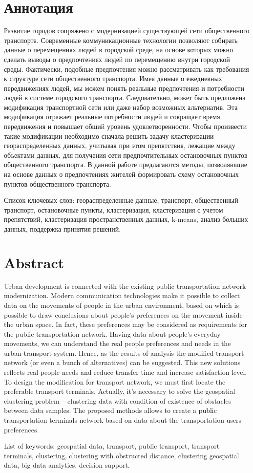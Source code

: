 \tocless\part{Аннотация}
Развитие городов сопряжено с модернизацией существующей сети общественного транспорта. Современные коммуникационные технологии позволяют собирать данные о перемещениях людей в городской среде, на основе которых можно сделать выводы о предпочтениях людей по перемещению внутри городской среды. Фактически, подобные предпочтения можно рассматривать как требования к структуре сети общественного транспорта. Имея данные о ежедневных передвижениях людей, мы можем понять реальные предпочтения и потребности людей в системе городского транспорта. Следовательно, может быть предложена модификация транспортной сети или даже набор возможных альтернатив. Эта модификация отражает реальные потребности людей и сокращает время передвижения и повышает общий уровень удовлетворенности. Чтобы произвести такие модификации необходимо сначала решить задачу кластеризации геораспределенных данных, учитывая при этом препятствия, лежащие между объектами данных, для получения сети предпочтительных остановочных пунктов общественного транспорта. В данной работе предлагаются методы, позволяющие на основе данных о предпочтениях жителей формировать схему остановочных пунктов общественного транспорта.

Список ключевых слов: геораспределенные данные, транспорт, общественный транспорт, остановочные пункты, кластеризация, кластеризация с учетом препятствий, кластеризация пространственных данных, k-means, анализ больших данных, поддержка принятия решений.

\tocless\part{Abstract}
Urban development is connected with the existing public transportation network modernization. Modern communication technologies make it possible to collect data on the movements of people in the urban environment, based on which is possible to draw conclusions about people's preferences on the movement inside the urban space. In fact, these preferences may be considered as requirements for the public transportation network. Having data about people's everyday movements, we can understand the real people preferences and needs in the urban transport system. Hence, as the results of analysis the modified transport network (or even a bunch of alternatives) can be suggested. This new solutions reflects real people needs and reduce transfer time and increase satisfaction level. To design the modification for transport network, we must first locate the preferable transport terminals. Actually, it's necessary to solve the geospatial clustering problem -- clustering data with condition of existence of obstacles between data samples.
The proposed methods allows to create a public transportation terminals network based on data about the transportation users preferences.

List of keywords: geospatial data, transport, public transport, transport termi\-nals, clustering, clustering with obstructed distance, clustering geospatial data, big data analytics, decision support.